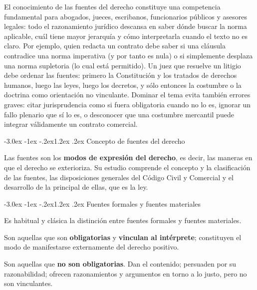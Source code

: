 \documentclass[12pt,oneside]{book}
\makeatletter
\renewcommand\section{\@startsection{section}{1}{\z@}%
  {-3.0ex \@plus -1ex \@minus -.2ex}{1.2ex \@plus .2ex}%
  {\normalfont\large\bfseries\color{acento}}}
\makeatother
\begin{document}
\begin{nota}
El conocimiento de las fuentes del derecho constituye una competencia fundamental para abogados, jueces, escribanos, funcionarios públicos y asesores legales: todo el razonamiento jurídico descansa en saber dónde buscar la norma aplicable, cuál tiene mayor jerarquía y cómo interpretarla cuando el texto no es claro. Por ejemplo, quien redacta un contrato debe saber si una cláusula contradice una norma imperativa (y por tanto es nula) o si simplemente desplaza una norma supletoria (lo cual está permitido). Un juez que resuelve un litigio debe ordenar las fuentes: primero la Constitución y los tratados de derechos humanos, luego las leyes, luego los decretos, y sólo entonces la costumbre o la doctrina como orientación no vinculante. Dominar el tema evita también errores graves: citar jurisprudencia como si fuera obligatoria cuando no lo es, ignorar un fallo plenario que sí lo es, o desconocer que una costumbre mercantil puede integrar válidamente un contrato comercial.
\end{nota}

\section{Concepto de fuentes del derecho}

Las fuentes son los \textbf{modos de expresión del derecho}, es decir, las maneras en que el derecho se exterioriza. Su estudio comprende el concepto y la clasificación de las fuentes, las disposiciones generales del Código Civil y Comercial y el desarrollo de la principal de ellas, que es la ley.

\section{Fuentes formales y fuentes materiales}

Es habitual y clásica la distinción entre fuentes formales y fuentes materiales.

\begin{definicion}
Son aquellas que son \textbf{obligatorias} y \textbf{vinculan al intérprete}; constituyen el modo de manifestarse externamente del derecho positivo.
\end{definicion}

\begin{definicion}
Son aquellas que \textbf{no son obligatorias}. Dan el contenido; persuaden por su razonabilidad; ofrecen razonamientos y argumentos en torno a lo justo, pero no son vinculantes.
\end{definicion}
\end{document}
